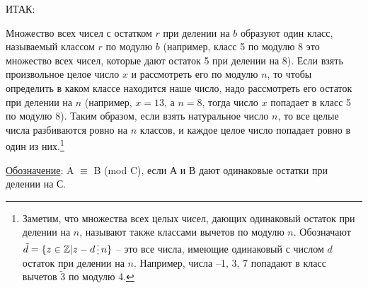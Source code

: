 \newpage

ИТАК:

Множество всех чисел $с$ остатком $r$ при делении на $b$ образуют один класс, называемый классом $r$ по модулю $b$ (например, класс 5 по модулю 8 это множество всех чисел, которые дают остаток 5 при делении на 8). Если взять произвольное целое число $x$ и рассмотреть его по модулю $n$, то чтобы определить в каком классе находится наше число, надо рассмотреть его остаток при делении на $n$ (например, $x = 13$, а $n = 8$, тогда число $x$ попадает в класс 5 по модулю 8). Таким образом, если взять натуральное число $n$, то все целые числа разбиваются ровно на $n$ классов, и каждое целое число попадает ровно в один из них.\footnote{Заметим, что множества всех целых чисел, дающих одинаковый остаток при делении на $n$, называют также классами вычетов по модулю $n$. Обозначают $ \tilde{d} = \{ z \in \mathbb{Z} | z - d \del n\}$ – это все числа, имеющие одинаковый с числом $d$ остаток при делении на $n$. Например, числа –1, 3, 7 попадают в класс вычетов $\tilde{3}$ по модулю 4.}

\underline{Обозначение}: A $\equiv$ B (mod C), если А и В дают одинаковые остатки при делении на С.


